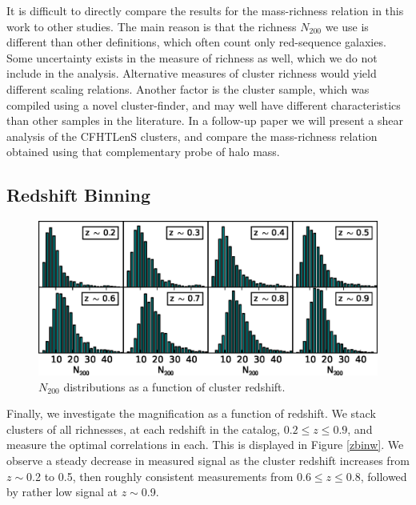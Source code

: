 It is difficult to directly compare the results for the mass-richness relation in this work to other studies. The main reason is that the richness $N_{200}$ we use is different than other definitions, which often count only red-sequence galaxies. Some uncertainty exists in the measure of richness as well, which we do not include in the analysis. Alternative measures of cluster richness would yield different scaling relations. Another factor is the cluster sample, which was compiled using a novel cluster-finder, and may well have different characteristics than other samples in the literature. In a follow-up paper we will present a shear analysis of the \ac{CFHTLenS} clusters, and compare the mass-richness relation obtained using that complementary probe of halo mass.


\subsection{Redshift Binning}
\label{zbin}

\begin{figure}
\begin{center}
\includegraphics[scale=1.0]{plots_ch3/zbin_histograms.eps}
\caption[Richness Distributions in Redshift Bins]{$N_{200}$ distributions as a function of cluster redshift.}
\label{zbinhist}
\end{center}
\end{figure}

Finally, we investigate the magnification as a function of redshift. We stack clusters of all richnesses, at each redshift in the catalog, $0.2 \leq z \leq 0.9$, and measure the optimal correlations in each. This is displayed in Figure \ref{zbinw}. We observe a steady decrease in measured signal as the cluster redshift increases from $z \sim$0.2 to 0.5, then roughly consistent measurements from 0.6$\leq z \leq$0.8, followed by rather low signal at $z \sim$0.9. 


